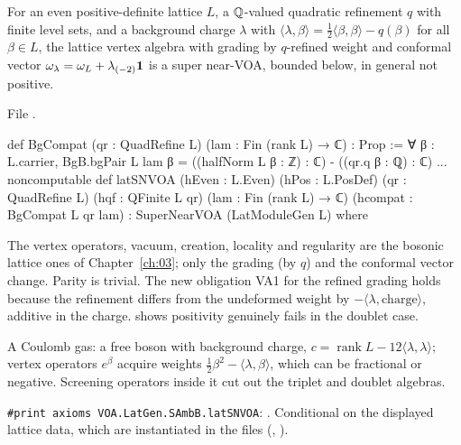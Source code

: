 \begin{theorem}\label{l17:thm:lattice}
For an even positive-definite lattice $L$, a ${\mathbb{Q}}$-valued quadratic refinement $q$ with finite level
sets, and a background charge $\lambda$ with $\langle\lambda,\beta\rangle=\frac12\langle\beta,\beta\rangle-q(\beta)$
for all $\beta\in L$, the lattice vertex algebra with grading by $q$-refined weight and conformal vector
$\omega_\lambda=\omega_L+\lambda_{(-2)}\mathbf{1}$ is a super near-VOA, bounded below, in general not
positive.
\end{theorem}
\noindent File .
\begin{leancode}
def BgCompat (qr : QuadRefine L) (lam : Fin (rank L) → ℂ) : Prop :=
  ∀ β : L.carrier, BgB.bgPair L lam β = ((halfNorm L β : ℤ) : ℂ) - ((qr.q β : ℚ) : ℂ)
...
noncomputable def latSNVOA (hEven : L.Even) (hPos : L.PosDef) (qr : QuadRefine L)
    (hqf : QFinite L qr) (lam : Fin (rank L) → ℂ) (hcompat : BgCompat L qr lam) :
    SuperNearVOA (LatModuleGen L) where
\end{leancode}
\begin{dictionary}
The vertex operators, vacuum, creation, locality and regularity are the bosonic lattice ones of
Chapter~\ref{ch:03}; only the grading (by $q$) and the conformal vector change. Parity is trivial.
The new obligation VA1 for the refined grading holds because the refinement differs from the
undeformed weight by $-\langle\lambda,\text{charge}\rangle$, additive in the charge.
 shows positivity genuinely fails in the doublet case.
\end{dictionary}
\begin{physics}
A Coulomb gas: a free boson with background charge, $c=\operatorname{rank}L-12\langle\lambda,\lambda\rangle$;
vertex operators $e^{\beta}$ acquire weights $\frac12\beta^2-\langle\lambda,\beta\rangle$, which can be
fractional or negative. Screening operators inside it cut out the triplet and doublet algebras.
\end{physics}
\begin{status}
\texttt{\#print axioms VOA.LatGen.SAmbB.latSNVOA}: . Conditional on the displayed
lattice data, which are instantiated in the files (, ).
\end{status}


